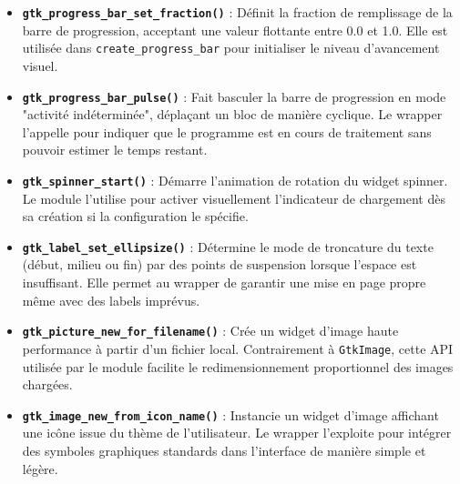 \begin{itemize}
    \item \textbf{\texttt{gtk\_progress\_bar\_set\_fraction()}} : Définit la fraction de remplissage de la barre de progression, acceptant une valeur flottante entre 0.0 et 1.0. Elle est utilisée dans \texttt{create\_progress\_bar} pour initialiser le niveau d'avancement visuel.
    \item \textbf{\texttt{gtk\_progress\_bar\_pulse()}} : Fait basculer la barre de progression en mode "activité indéterminée", déplaçant un bloc de manière cyclique. Le wrapper l'appelle pour indiquer que le programme est en cours de traitement sans pouvoir estimer le temps restant.
    \item \textbf{\texttt{gtk\_spinner\_start()}} : Démarre l'animation de rotation du widget spinner. Le module l'utilise pour activer visuellement l'indicateur de chargement dès sa création si la configuration le spécifie.
    \item \textbf{\texttt{gtk\_label\_set\_ellipsize()}} : Détermine le mode de troncature du texte (début, milieu ou fin) par des points de suspension lorsque l'espace est insuffisant. Elle permet au wrapper de garantir une mise en page propre même avec des labels imprévus.
    \item \textbf{\texttt{gtk\_picture\_new\_for\_filename()}} : Crée un widget d'image haute performance à partir d'un fichier local. Contrairement à \texttt{GtkImage}, cette API utilisée par le module facilite le redimensionnement proportionnel des images chargées.
    \item \textbf{\texttt{gtk\_image\_new\_from\_icon\_name()}} : Instancie un widget d'image affichant une icône issue du thème de l'utilisateur. Le wrapper l'exploite pour intégrer des symboles graphiques standards dans l'interface de manière simple et légère.
\end{itemize}

\newpage
